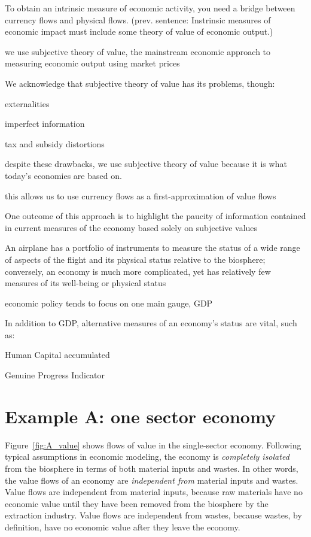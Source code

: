 \begin{outline}[enumerate]
\1 To obtain an intrinsic measure of economic activity, you need a bridge between currency flows and physical flows.  (prev. sentence: Instrinsic measures of economic impact must include some theory of value of economic output.)

	\2 we use subjective theory of value, the mainstream economic approach to measuring economic output using market prices

	\2 We acknowledge that subjective theory of value has its problems, though:

		\3 externalities

		\3 imperfect information

		\3 tax and subsidy distortions

	\2 despite these drawbacks, we use subjective theory of value because it is what today's economies are based on.

	\2 this allows us to use currency flows as a first-approximation of value flows

\1 One outcome of this approach is to highlight the paucity of information contained in current measures of the economy based solely on subjective values

	\2 An airplane has a portfolio of instruments to measure the status of a wide range of aspects of the flight and its physical status relative to the biosphere; conversely, an economy is much more complicated, yet has relatively few measures of its well-being or physical status

	\2 economic policy tends to focus on one main gauge, GDP

	\2 In addition to GDP, alternative measures of an economy's status are vital, such as:

		\3 Human Capital accumulated

		\3 Genuine Progress Indicator

\end{outline}


\section{Example A: one sector economy}

Figure~\ref{fig:A_value} shows flows of value in the single-sector economy.
Following typical assumptions in economic modeling, 
the economy is \emph{completely isolated} from the biosphere
in terms of both material inputs and wastes.
In other words, the value flows of an economy are \emph{independent from}
material inputs and wastes.
Value flows are independent from material inputs,
because raw materials have no economic value 
until they have been removed from the biosphere by the extraction industry.
Value flows are independent from wastes,
because wastes, by definition, have no economic value 
after they leave the economy.

